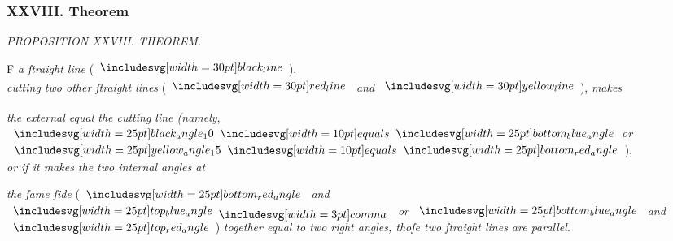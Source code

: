 \documentclass[11pt,preview]{standalone}
\begin{document}
\subsubsection{XXVIII. Theorem}

\begin{minipage}[t]{0.55\textwidth}
    \begin{center}
        \textit{PROPOSITION XXVIII. THEOREM.}\label{book1pr28} \\
    \end{center}

    \hfill

    \begin{center}
        \raggedright \lettrine[lines=3, loversize=1, nindent=0pt]{}{}F \textit{a ſtraight line} (\hspace{-1ex}$\blackline$\hspace{-1ex}),\\ \textit{cutting two other ſtraight lines} (\hspace{-1ex}$\redline$ \textit{and} $\yellowline$\hspace{-1ex}), \textit{makes}
    \end{center}
    \textit{the external equal the cutting line (namely},\\ $\img{black_angle_10} \hspace{-1ex}\bequals \hspace{-1ex}\img{bottom_blue_angle}$\textit{or} $\img{yellow_angle_15} \hspace{-1ex}\bequals \hspace{-1ex}\img{bottom_red_angle}$\hspace{-1ex}),\\ \textit{or if it makes the two internal angles at}
\end{minipage}%
\hfill
\begin{minipage}[t]{0.43\textwidth}
    \vspace{20pt}
    
\end{minipage}

\textit{the ſame ſide} (\hspace{-1ex}$\img{bottom_red_angle}$ \textit{and} $\img{top_blue_angle} \bcomma$ \textit{or} $\img{bottom_blue_angle}$ \textit{and} $\img{top_red_angle}$\hspace{-1ex}) \textit{together equal to two right angles, thoſe two ſtraight lines are parallel}.

\hfill
\end{document}
